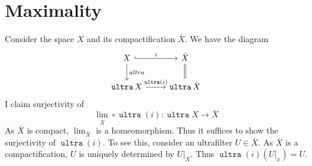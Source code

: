 \documentclass[10pt]{scrartcl}
\numberwithin{thms}{section}
\theoremstyle{definition}
\renewcommand{\lim}{\operatorname{lim}}
\newcommand{\ultra}{\operatorname{\mathtt{ultra}}}
\begin{document}
\section{Maximality}
Consider the space $X$ and its compactification $\bar X$. We have the diagram
\[
\begin{tikzcd}
  X\rar[hook]{i}\dar{ultra} & \bar X\dar[equal] \\
  \ultra{X} \rar{\ultra(i)} & \ultra{\bar{X}}
\end{tikzcd}
\]
I claim surjectivity of 
\[
\lim_{\bar X}\circ\ultra(i):\ultra X\to \bar X
\]
As $\bar X$ is compact, $\lim_{\bar X}$ is a homeomorphism. Thus it suffices to show the surjectivity of $\ultra(i)$. To see this, consider an ultrafilter $U\in\bar{X}$. As $\bar X$ is a compactification, $U$ is uniquely determined by $U|_X$. Thus $\ultra(i)\left(U|_x\right)=U$.
\end{document}
